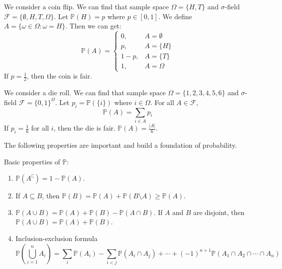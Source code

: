 \documentclass{huhtakm-template-book}
\newcommand{\prob}{\mathbb{P}}
\begin{document}
    \newpage
    \begin{eg}
        We consider a coin flip. We can find that sample space $\Omega=\{H,T\}$ and $\sigma$-field $\mathcal{F}=\{\emptyset,H,T,\Omega\}$. Let $\prob(H)=p$ where $p\in[0,1]$. We define $A=\{\omega\in\Omega:\omega = H\}$. Then we can get:
        \begin{equation*}
            \prob(A)=\begin{cases}
                0, &A=\emptyset\\
                p, &A=\{H\}\\
                1-p, &A=\{T\}\\
                1, &A=\Omega
            \end{cases}
        \end{equation*}
        If $p=\frac{1}{2}$, then the coin is fair.   
    \end{eg}
    \begin{eg}
        We consider a die roll. We can find that sample space $\Omega=\{1,2,3,4,5,6\}$ and $\sigma$-field $\mathcal{F}=\{0,1\}^{\Omega}$. Let $p_{i}=\prob(\{i\})$ where $i\in\Omega$. For all $A\in\mathcal{F}$,
        \begin{equation*}
            \prob(A)=\sum_{i\in A}p_{i}
        \end{equation*}
        If $p_{i}=\frac{1}{6}$ for all $i$, then the die is fair. $\prob(A)=\frac{|A|}{6}$.
    \end{eg}
    The following properties are important and build a foundation of probability.
    \begin{lem}
        Basic properties of $\prob$:
        \begin{enumerate}
            \item $\prob(A^{\complement})=1-\prob(A)$.
            \item If $A\subseteq B$, then $\prob(B)=\prob(A)+\prob(B\setminus A)\geq\prob(A)$.
            \item $\prob(A\cup B)=\prob(A)+\prob(B)-\prob(A\cap B)$. If $A$ and $B$ are disjoint, then $\prob(A\cup B)=\prob(A)+\prob(B)$.
            \item Inclusion-exclusion formula
            \begin{equation*}
                \prob\left(\bigcup_{i=1}^{n}A_{i}\right)=\sum_{i}\prob(A_{i})-\sum_{i<j}\prob(A_{i}\cap A_{j})+\cdots+(-1)^{n+1}\prob(A_{1}\cap A_{2}\cap\cdots\cap A_{n})
            \end{equation*}
        \end{enumerate}
    \end{lem}
\end{document}
